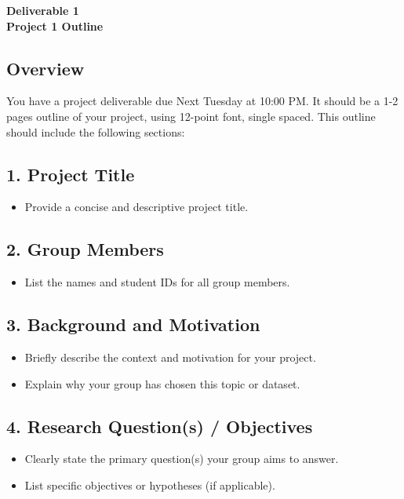 \documentclass[12pt]{article}
\begin{document}
\begin{center}
\textbf{\Large Deliverable 1 \\ Project 1 Outline} 
\end{center}

\subsection*{Overview}
You have a project deliverable due Next Tuesday at 10:00 PM. It should be a 1-2 pages outline of your project, using 12-point font, single spaced.
This outline should include the following sections:


\subsection*{1. Project Title}
\begin{itemize}
    \item Provide a concise and descriptive project title.
\end{itemize}

\subsection*{2. Group Members}
\begin{itemize}
    \item List the names and student IDs for all group members.
\end{itemize}

\subsection*{3. Background and Motivation}
\begin{itemize}
    \item Briefly describe the context and motivation for your project.
    \item Explain why your group has chosen this topic or dataset.
\end{itemize}

\subsection*{4. Research Question(s) / Objectives}
\begin{itemize}
    \item Clearly state the primary question(s) your group aims to answer.
    \item List specific objectives or hypotheses (if applicable).
\end{itemize}
\end{document}
